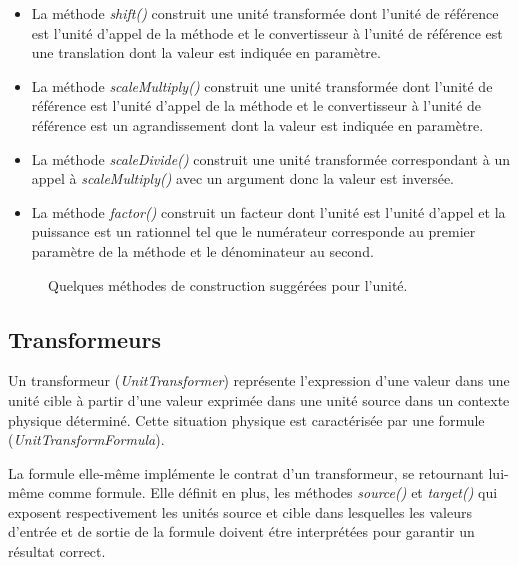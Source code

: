 \documentclass[a4paper,twoside,10pt]{article}
\begin{document}
\begin{itemize}
\item La méthode \emph{shift()} construit une unité transformée dont l'unité de référence est l'unité d'appel de la
méthode et le convertisseur à l'unité de référence est une translation dont la valeur est indiquée en paramètre.
\item La méthode \emph{scaleMultiply()} construit une unité transformée dont l'unité de référence est l'unité d'appel de
la méthode et le convertisseur à l'unité de référence est un agrandissement dont la valeur est indiquée en paramètre.
\item La méthode \emph{scaleDivide()} construit une unité transformée correspondant à un appel à \emph{scaleMultiply()}
avec un argument donc la valeur est inversée.
\item La méthode \emph{factor()} construit un facteur dont l'unité est l'unité d'appel et la puissance est un rationnel
tel que le numérateur corresponde au premier paramètre de la méthode et le dénominateur au second.
\end{itemize}


\begin{figure}[!h]
\caption{Quelques méthodes de construction suggérées pour l'unité.}
\end{figure}


\subsection{Transformeurs}

Un transformeur (\emph{UnitTransformer}) représente l'expression d'une valeur dans une unité cible à partir d'une valeur
exprimée dans une unité source dans un contexte physique déterminé. Cette situation physique est caractérisée par une
formule (\emph{UnitTransformFormula}).

La formule elle-même implémente le contrat d'un transformeur, se retournant lui-même comme formule. Elle définit en
plus, les méthodes \emph{source()} et \emph{target()} qui exposent respectivement les unités source et cible dans
lesquelles les valeurs d'entrée et de sortie de la formule doivent étre interprétées pour garantir un résultat correct.
\end{document}
